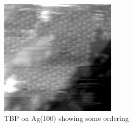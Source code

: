 \begin{figure}[h]
 \centering
 \includegraphics[width=0.5\textwidth]{./images/F151007-112800}
 \caption{TBP on Ag(100) showing some ordering}
 \label{fig:hex-TBP-Ag100}
\end{figure}

